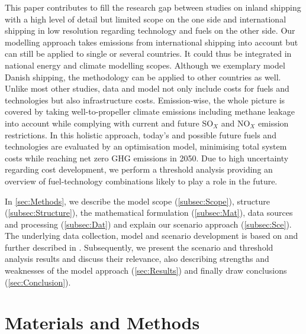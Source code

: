 \documentclass[article]{elsarticle}
\begin{document}
This paper contributes to fill the research gap between studies on inland shipping with a high level of detail but limited scope on the one side and international shipping in low resolution regarding technology and fuels on the other side. Our modelling approach takes emissions from international shipping into account but can still be applied to single or several countries. It could thus be integrated in national energy and climate modelling scopes. Although we exemplary model Danish shipping, the methodology can be applied to other countries as well.
Unlike most other studies, data and model not only include costs for fuels and technologies but also infrastructure costs. Emission-wise, the whole picture is covered by taking well-to-propeller climate emissions including methane leakage into account while complying with current and future SO$_X$ and NO$_X$ emission restrictions.
In this holistic approach, today's and possible future fuels and technologies are evaluated by an optimisation model, minimising total system costs while reaching net zero GHG emissions in 2050. Due to high uncertainty regarding cost development, we perform a threshold analysis providing an overview of fuel-technology combinations likely to play a role in the future.

In \autoref{sec:Methods}, we describe the model scope (\autoref{subsec:Scope}), structure (\autoref{subsec:Structure}), the mathematical formulation (\autoref{subsec:Mat}), data sources and processing (\autoref{subsec:Dat}) and explain our scenario approach (\autoref{subsec:Sce}). The underlying data collection, model and scenario development is based on and further described in \cite{Thesis2018}. Subsequently, we present the scenario and threshold analysis results and discuss their relevance, also describing strengths and weaknesses of the model approach (\autoref{sec:Results}) and finally draw conclusions (\autoref{sec:Conclusion}).  

\section{Materials and Methods}
\label{sec:Methods}
\end{document}
